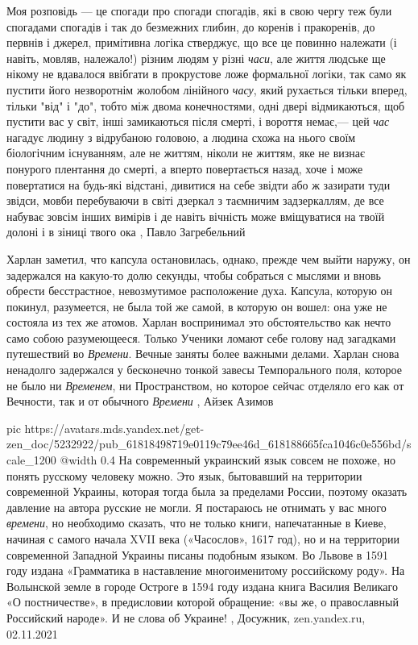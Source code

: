 Моя розповідь — це спогади про спогади спогадів, які в свою чергу теж були
спогадами спогадів і так до безмежних глибин, до коренів і пракоренів, до
первнів і джерел, примітивна логіка стверджує, що все це повинно належати (і
навіть, мовляв, належало!) різним людям у різні \emph{часи}, але життя людське ще
нікому не вдавалося ввібгати в прокрустове ложе формальної логіки, так само як
пустити його незворотнім жолобом лінійного \emph{часу}, який рухається тільки вперед,
тільки "від" і "до", тобто між двома конечностями, одні двері відмикаються, щоб
пустити вас у світ, інші замикаються після смерті, і вороття немає,— цей \emph{час}
нагадує людину з відрубаною головою, а людина схожа на нього своїм біологічним
існуванням, але не життям, ніколи не життям, яке не визнає понурого плентання
до смерті, а вперто повертається назад, хоче і може повертатися на будь-які
відстані, дивитися на себе звідти або ж зазирати туди звідси, мовби перебуваючи
в світі дзеркал з таємничим задзеркаллям, де все набуває зовсім інших вимірів і
де навіть вічність може вміщуватися на твоїй долоні і в зіниці твого ока
, Павло Загребельний 

Харлан заметил, что капсула остановилась, однако, прежде чем выйти наружу, он
задержался на какую-то долю секунды, чтобы собраться с мыслями и вновь обрести
бесстрастное, невозмутимое расположение духа. Капсула, которую он покинул,
разумеется, не была той же самой, в которую он вошел: она уже не состояла из
тех же атомов. Харлан воспринимал это обстоятельство как нечто само собою
разумеющееся. Только Ученики ломают себе голову над загадками путешествий во
\emph{Времени}. Вечные заняты более важными делами.  Харлан снова ненадолго
задержался у бесконечно тонкой завесы Темпорального поля, которое не было ни
\emph{Временем}, ни Пространством, но которое сейчас отделяло его как от Вечности, так
и от обычного \emph{Времени}
, Айзек Азимов

\ifcmt
  pic https://avatars.mds.yandex.net/get-zen_doc/5232922/pub_61818498719e0119c79ee46d_618188665fca1046c0e556bd/scale_1200
  @width 0.4
\fi
На современный украинский язык совсем не похоже, но понять русскому человеку
можно. Это язык, бытовавший на территории современной Украины, которая тогда
была за пределами России, поэтому оказать давление на автора русские не могли.
Я постараюсь не отнимать у вас много \emph{времени}, но необходимо сказать, что
не только книги, напечатанные в Киеве, начиная с самого начала XVII века
(«Часослов», 1617 год), но и на территории современной Западной Украины писаны
подобным языком. Во Львове в 1591 году издана «Грамматика в наставление
многоименитому российскому роду». На Волынской земле в городе Остроге в 1594
году издана книга Василия Великаго «О постничестве», в предисловии которой
обращение: «вы же, о православный Российский народе». И не слова об Украине!
, Досужник, zen.yandex.ru, 02.11.2021

